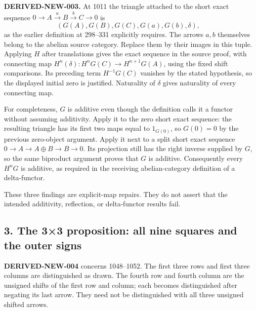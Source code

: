 \textbf{DERIVED-NEW-003.} At 1011 the triangle attached to the short exact sequence \(0\to A\xrightarrow{a}B\xrightarrow{b}C\to0\) is \[
(G(A),G(B),G(C),G(a),G(b),\delta),
\] as the earlier definition at 298–\allowbreak{}331 explicitly requires. The arrows \(a,b\) themselves belong to the abelian source category. Replace them by their images in this tuple. Applying \(H\) after translations gives the exact sequence in the source proof,\allowbreak{} with connecting map \(H^n(\delta):H^nG(C)\to H^{n+1}G(A)\),\allowbreak{} using the fixed shift comparisons. Its preceding term \(H^{-1}G(C)\) vanishes by the stated hypothesis,\allowbreak{} so the displayed initial zero is justified. Naturality of \(\delta\) gives naturality of every connecting map.

For completeness,\allowbreak{} \(G\) is additive even though the definition calls it a functor without assuming additivity. Apply it to the zero short exact sequence:\allowbreak{} the resulting triangle has its first two maps equal to \(1_{G(0)}\),\allowbreak{} so \(G(0)=0\) by the previous zero-object argument. Apply it next to a split short exact sequence \(0\to A\to A\oplus B\to B\to0\). Its projection still has the right inverse supplied by \(G\),\allowbreak{} so the same biproduct argument proves that \(G\) is additive. Consequently every \(H^nG\) is additive,\allowbreak{} as required in the receiving abelian-category definition of a delta-functor.

These three findings are explicit-map repairs. They do not assert that the intended additivity,\allowbreak{} reflection,\allowbreak{} or delta-functor results fail.

\subsection{\texorpdfstring{3. The 3×3 proposition:\allowbreak{} all nine squares and the outer signs}{3. The 3×3  all nine squares and the outer signs}}\label{proofs-0001-1140-the-33-proposition-all-nine-squares-and-the-outer-signs}

\textbf{DERIVED-NEW-004} concerns 1048–\allowbreak{}1052. The first three rows and first three columns are distinguished as drawn. The fourth row and fourth column are the unsigned shifts of the first row and column; each becomes distinguished after negating its last arrow. They need not be distinguished with all three unsigned shifted arrows.

